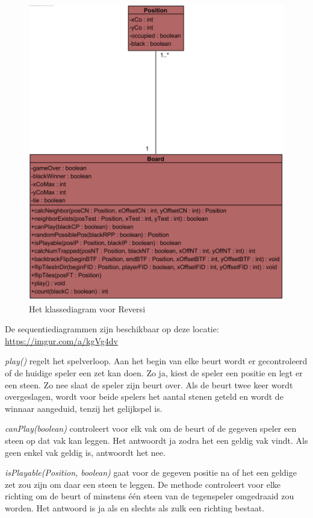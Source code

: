 \begin{figure}
	\centering
	\includegraphics[width=\textwidth]{chap-evaluatie/reversi-cd.png}
	\caption{Het klassediagram voor Reversi}
	\label{fig:reversi-cd}
\end{figure}

De sequentiediagrammen zijn beschikbaar op deze locatie: \url{https://imgur.com/a/kgVg4dv} 

\textit{play()} regelt het spelverloop. Aan het begin van elke beurt wordt er gecontroleerd of de huidige speler een zet kan doen. Zo ja, kiest de speler een positie en legt er een steen. Zo nee slaat de speler zijn beurt over. Als de beurt twee keer wordt overgeslagen, wordt voor beide spelers het aantal stenen geteld en wordt de winnaar aangeduid, tenzij het gelijkspel is.

\textit{canPlay(boolean)} controleert voor elk vak om de beurt of de gegeven speler een steen op dat vak kan leggen. Het antwoordt ja zodra het een geldig vak vindt. Als geen enkel vak geldig is, antwoordt het nee.

\textit{isPlayable(Position, boolean)} gaat voor de gegeven positie na of het een geldige zet zou zijn om daar een steen te leggen. De methode controleert voor elke richting om de beurt of minstens \'e\'en steen van de tegenspeler omgedraaid zou worden. Het antwoord is ja als en slechts als zulk een richting bestaat. 

